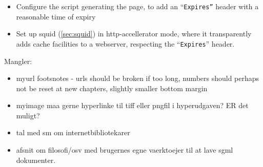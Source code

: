\documentclass[11pt,ddraft,a4paper]{book}
\begin{document}
\begin{itemize}
\item Configure the script generating the page, to add an
  ``\texttt{Expires''} header with a reasonable time of expiry
\item Set up squid (\vref{sec:squid}) in http-accellerator mode, where
  it transparently adds cache facilities to a webserver, respecting
  the ``\texttt{Expires}'' header.
\end{itemize}


Mangler:

\begin{itemize}
\item myurl footsnotes - urls should be broken if too long, numbers
  should perhaps not be reset at new chapters, slightly smaller bottom
  margin 
  
  
  
\item myimage maa gerne hyperlinke til tiff eller pngfil i
  hyperudgaven?  ER det muligt?
\item tal med sm om internetbibliotekarer
\item afsnit om filosofi/osv med brugernes egne vaerktoejer til at
  lave sgml dokumenter.

  
\end{itemize}
\end{document}
